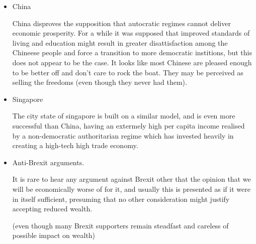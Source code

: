 \documentclass[14pt,titlepage]{extarticle}
\begin{document}
\begin{itemize}
\item China

  China disproves the supposition that autocratic regimes cannot deliver economic prosperity.
  For a while it was supposed that improved standards of living and education might result in greater disattisfaction among the Chineese people and force a transition to more democratic institions, but this does not appear to be the case.
  It looks like most Chinese are pleased enough to be better off and don't care to rock the boat.
  They may be perceived as selling the freedoms (even though they never had them).
  
\item Singapore

  The city state of singapore is built on a similar model, and is even more successful than China, having an extermely high per capita income realised by a non-democratic authoritarian regime which has invested heavily in creating a high-tech high trade economy.
  
\item Anti-Brexit arguments.

  It is rare to hear any argument against Brexit other that the opinion that we will be economically worse of for it, and usually this is presented as if it were in itself sufficient, presuming that no other consideration might justify accepting reduced wealth.

  (even though many Brexit supporters remain steadfast and careless of possible impact on wealth)
  
\end{itemize}



%
%






\end{document}
